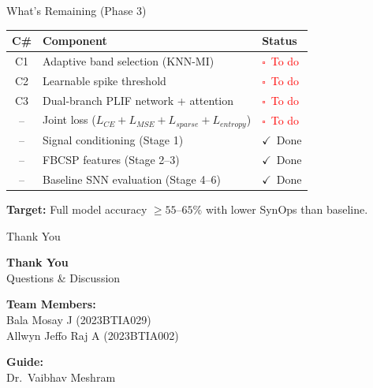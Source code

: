 \documentclass[10pt]{beamer}
\begin{document}
\begin{frame}{What's Remaining (Phase 3)}

\begin{center}
\footnotesize
\begin{tabular}{cll}
\toprule
\textbf{C\#} & \textbf{Component} & \textbf{Status} \\
\midrule
C1 & Adaptive band selection (KNN-MI) & \textcolor{red}{$\square$~To do} \\
C2 & Learnable spike threshold & \textcolor{red}{$\square$~To do} \\
C3 & Dual-branch PLIF network + attention & \textcolor{red}{$\square$~To do} \\
-- & Joint loss ($L_{CE} + L_{MSE} + L_{sparse} + L_{entropy}$) & \textcolor{red}{$\square$~To do} \\
\midrule
\rowcolor{blue!8}
-- & Signal conditioning (Stage 1) & \textcolor{green!60!black}{$\checkmark$~Done} \\
\rowcolor{blue!8}
-- & FBCSP features (Stage 2--3) & \textcolor{green!60!black}{$\checkmark$~Done} \\
\rowcolor{blue!8}
-- & Baseline SNN evaluation (Stage 4--6) & \textcolor{green!60!black}{$\checkmark$~Done} \\
\bottomrule
\end{tabular}
\end{center}

\vspace{4pt}
\textbf{Target:} Full model accuracy $\geq 55$--$65\%$ with lower SynOps than baseline.

\end{frame}

\begin{frame}{Thank You}

\begin{center}
\vspace{8pt}
{\Large\textbf{Thank You}}\\[10pt]
{\large Questions \& Discussion}

\vspace{16pt}
\textbf{Team Members:}\\
Bala Mosay J \quad (2023BTIA029)\\
Allwyn Jeffo Raj A \quad (2023BTIA002)

\vspace{8pt}
\textbf{Guide:}\\
Dr.\ Vaibhav Meshram
\end{center}

\end{frame}
\end{document}
